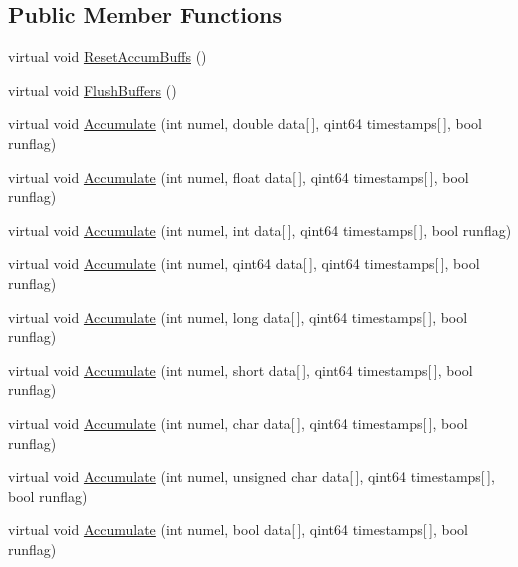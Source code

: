 \subsection*{\-Public \-Member \-Functions}
\begin{DoxyCompactItemize}
\item 
virtual void \hyperlink{classGRIDAQBaseAccumNode_af4922ce0edf51ffedbcc7cedc993c1cc}{\-Reset\-Accum\-Buffs} ()
\item 
virtual void \hyperlink{classGRIDAQBaseAccumNode_a4fde603a1ed8568408930912e51f4b84}{\-Flush\-Buffers} ()
\item 
virtual void \hyperlink{classGRIDAQBaseAccumNode_a1dfaaf425a5a808862d60b728b83005a}{\-Accumulate} (int numel, double data\mbox{[}$\,$\mbox{]}, qint64 timestamps\mbox{[}$\,$\mbox{]}, bool runflag)
\item 
virtual void \hyperlink{classGRIDAQBaseAccumNode_ab703d471ecbc4ad1f0732814e108ffbb}{\-Accumulate} (int numel, float data\mbox{[}$\,$\mbox{]}, qint64 timestamps\mbox{[}$\,$\mbox{]}, bool runflag)
\item 
virtual void \hyperlink{classGRIDAQBaseAccumNode_aaf241c53925111f17fe7f5ca50cc65af}{\-Accumulate} (int numel, int data\mbox{[}$\,$\mbox{]}, qint64 timestamps\mbox{[}$\,$\mbox{]}, bool runflag)
\item 
virtual void \hyperlink{classGRIDAQBaseAccumNode_af67b21c2e8ec99b46e184f0e094ccf00}{\-Accumulate} (int numel, qint64 data\mbox{[}$\,$\mbox{]}, qint64 timestamps\mbox{[}$\,$\mbox{]}, bool runflag)
\item 
virtual void \hyperlink{classGRIDAQBaseAccumNode_ac2ed29b6004c15a449a1378229c4b355}{\-Accumulate} (int numel, long data\mbox{[}$\,$\mbox{]}, qint64 timestamps\mbox{[}$\,$\mbox{]}, bool runflag)
\item 
virtual void \hyperlink{classGRIDAQBaseAccumNode_a20e35d318a811336ebff95a3dc3fc507}{\-Accumulate} (int numel, short data\mbox{[}$\,$\mbox{]}, qint64 timestamps\mbox{[}$\,$\mbox{]}, bool runflag)
\item 
virtual void \hyperlink{classGRIDAQBaseAccumNode_ad158be798eab23a9c665a62d76ce5338}{\-Accumulate} (int numel, char data\mbox{[}$\,$\mbox{]}, qint64 timestamps\mbox{[}$\,$\mbox{]}, bool runflag)
\item 
virtual void \hyperlink{classGRIDAQBaseAccumNode_ab3f7076555e040893fa08838d932a4e9}{\-Accumulate} (int numel, unsigned char data\mbox{[}$\,$\mbox{]}, qint64 timestamps\mbox{[}$\,$\mbox{]}, bool runflag)
\item 
virtual void \hyperlink{classGRIDAQBaseAccumNode_a7fb71d89ad3890ead20f12d7fff5e0aa}{\-Accumulate} (int numel, bool data\mbox{[}$\,$\mbox{]}, qint64 timestamps\mbox{[}$\,$\mbox{]}, bool runflag)

\end{DoxyCompactItemize}
